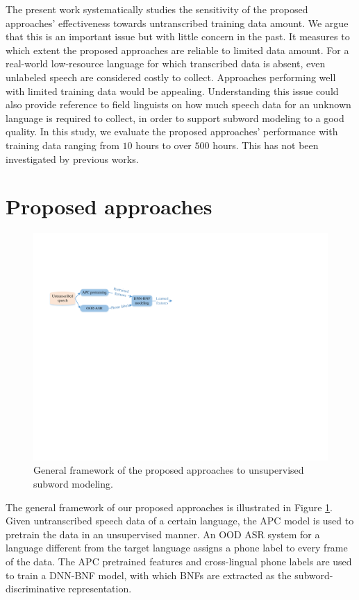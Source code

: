 \documentclass[a4paper]{article}
\begin{document}
The present work systematically studies the  sensitivity of the proposed approaches' effectiveness towards    untranscribed training data amount.  We argue that this is an important issue but with little concern in the past. 
It measures to which extent the proposed approaches are reliable to limited data amount. For a real-world low-resource language for which transcribed data is absent, 
even unlabeled speech are considered costly to collect. Approaches performing well with limited training data  would be appealing. 
Understanding this issue  could also provide reference to field linguists on how much speech data for an unknown language  is required to collect, in order to support subword modeling to a good quality. 
In this study, we evaluate the proposed approaches' performance with    training data ranging from $10$ hours to over $500$ hours. This has not been investigated by previous works.


\section{Proposed approaches}

\begin{figure}
    \centering
    \includegraphics[width=0.95\linewidth]{LaTeX/apc_framework.pdf}
    \caption{General framework of the proposed approaches to unsupervised subword modeling.  }
    \label{fig:general_framework}
\end{figure}
The general framework of our proposed approaches is illustrated in Figure \ref{fig:general_framework}. Given untranscribed speech data of a certain  language, the APC  model is used to pretrain the data in an unsupervised manner. An OOD ASR system for a language different from the target language  assigns a phone label to every frame of the data. The APC pretrained features and  cross-lingual phone labels are used to train a DNN-BNF model, with which BNFs are extracted as the subword-discriminative representation.
\end{document}
